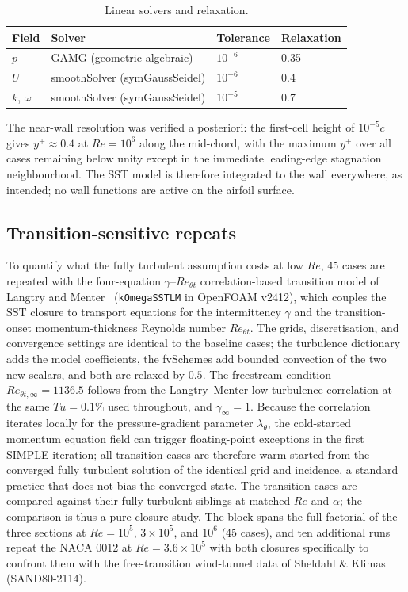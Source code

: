 \documentclass[11pt,a4paper]{article}
\begin{document}
\begin{table}[t]
  \centering
  \caption{Linear solvers and relaxation.}
  \label{tab:linear}
  \begin{tabular}{llll}
    \toprule
    Field & Solver & Tolerance & Relaxation \\
    \midrule
    $p$ & GAMG (geometric-algebraic) & $10^{-6}$ & 0.35 \\
    $U$ & smoothSolver (symGaussSeidel) & $10^{-6}$ & 0.4 \\
    $k$, $\omega$ & smoothSolver (symGaussSeidel) & $10^{-5}$ & 0.7 \\
    \bottomrule
  \end{tabular}
\end{table}

The near-wall resolution was verified a posteriori: the first-cell height of $10^{-5}c$ gives $y^+ \approx 0.4$ at $Re=10^6$ along the mid-chord, with the maximum $y^+$ over all cases remaining below unity except in the immediate leading-edge stagnation neighbourhood. The SST model is therefore integrated to the wall everywhere, as intended; no wall functions are active on the airfoil surface.

\subsection{Transition-sensitive repeats}\label{sec:trmethod}
To quantify what the fully turbulent assumption costs at low $Re$, 45 cases are repeated with the four-equation $\gamma$--$Re_{\theta t}$ correlation-based transition model of Langtry and Menter~\cite{langtry2009} (\texttt{kOmegaSSTLM} in OpenFOAM v2412), which couples the SST closure to transport equations for the intermittency $\gamma$ and the transition-onset momentum-thickness Reynolds number $Re_{\theta t}$. The grids, discretisation, and convergence settings are identical to the baseline cases; the turbulence dictionary adds the model coefficients, the fvSchemes add bounded convection of the two new scalars, and both are relaxed by $0.5$. The freestream condition $Re_{\theta t,\infty} = 1136.5$ follows from the Langtry--Menter low-turbulence correlation at the same $Tu = 0.1\%$ used throughout, and $\gamma_\infty = 1$. Because the correlation iterates locally for the pressure-gradient parameter $\lambda_\theta$, the cold-started momentum equation field can trigger floating-point exceptions in the first SIMPLE iteration; all transition cases are therefore warm-started from the converged fully turbulent solution of the identical grid and incidence, a standard practice that does not bias the converged state. The transition cases are compared against their fully turbulent siblings at matched $Re$ and $\alpha$; the comparison is thus a pure closure study. The block spans the full factorial of the three sections at $Re = 10^5$, $3\times10^5$, and $10^6$ (45 cases), and ten additional runs repeat the NACA 0012 at $Re = 3.6\times10^5$ with both closures specifically to confront them with the free-transition wind-tunnel data of Sheldahl \& Klimas (SAND80-2114).
\end{document}
